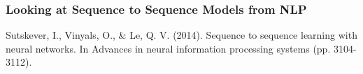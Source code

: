
\begin{frame}[t]
\frametitle{Looking at Sequence to Sequence Models from NLP}

\begin{center}
	
\end{center}
%	
%	


{\small
	Sutskever, I., Vinyals, O., \& Le, Q. V. (2014). Sequence to sequence learning with neural networks. In Advances in neural information processing systems (pp. 3104-3112).}


\end{frame}

